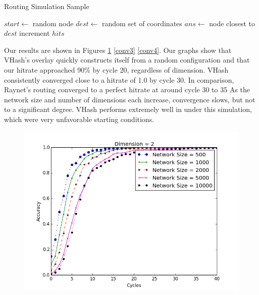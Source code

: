 \documentclass{IEEEtran}
\begin{document}
 


\begin{algorithm}
\caption{Routing Simulation Sample}
\label{routesim}
\begin{algorithmic}[1]  %
	\STATE $start \leftarrow$ random node
	\STATE $dest \leftarrow$ random set of coordinates
    \STATE $ans \leftarrow$ node closest to $dest$
    	\STATE increment $hits$
    \ENDIF
\end{algorithmic} 
\end{algorithm}



Our results are shown in Figures \ref{conv2} \ref{conv3} \ref{conv4}.
Our graphs show that VHash's overlay quickly constructs itself from a random configuration and that our hitrate approached 90\% by cycle 20, regardless of dimension.
VHash consistently converged close to a hitrate of 1.0 by cycle 30. 
In comparison, Raynet's routing converged to a perfect hitrate at around cycle 30 to 35 \cite{raynet} 
As the network size and number of dimensions each increase, convergence slows, but not to a significant degree.
VHash performs extremely well in under this simulation, which were very unfavorable starting conditions.  


\begin{figure}
	\centering
	\includegraphics[width=\linewidth]{conv_d2}
	\caption{}
	\label{conv2}
\end{figure}
\end{document}
